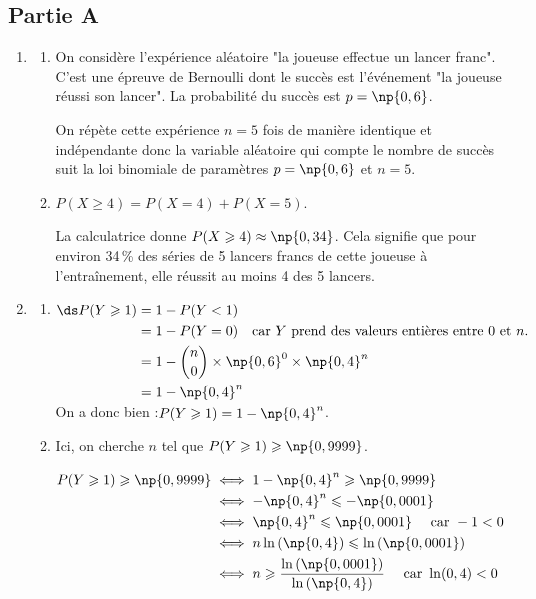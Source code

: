 \subsection*{Partie A}

	\medskip

	\begin{enumerate}
		\item \begin{enumerate}
			\item On considère l'expérience aléatoire "la joueuse effectue un lancer franc". C'est une épreuve de Bernoulli dont le succès est l'événement "la joueuse réussi son lancer". La probabilité du succès est $p=\np{0,6}$.

			On répète cette expérience $n=5$ fois de manière identique et indépendante donc la variable aléatoire qui compte le nombre de succès suit la loi binomiale de paramètres $p=\np{0,6}$ et $n=5$.

			\item $P(X \geqslant 4)=P(X=4) + P(X=5)$.

			La calculatrice donne $P(X \geqslant 4) \approx \np{0,34}$. Cela signifie que pour environ 34\,\% des séries de 5 lancers francs de cette joueuse à l'entraînement, elle réussit au moins 4 des 5 lancers.
		\end{enumerate}

		\item \begin{enumerate}
			\item $\ds \begin{aligned}[t] P(Y \geqslant 1) &=1 - P(Y < 1) \\
				& =1 - P(Y=0)\quad \text{car $Y$ prend des valeurs entières entre 0 et $n$.}\\
				& = 1 - \binom{n}{0} \times \np{0,6}^0 \times \np{0,4}^n\\
				& =1 - \np{0,4}^n
			\end{aligned}$
			On a donc bien :\quad $P(Y \geqslant 1)  =1 - \np{0,4}^n$.

			\item Ici, on cherche $n$ tel que $P(Y \geqslant 1) \geqslant \np{0,9999}$.

			$\begin{aligned}[t] P(Y \geqslant 1) \geqslant \np{0,9999} &\iff 1- \np{0,4}^n \geqslant \np{0,9999}\\
			& \iff -\np{0,4}^n \leqslant -\np{0,0001}\\
			& \iff \np{0,4}^n \leqslant \np{0,0001}\quad \text{ car } -1 < 0\\
			& \iff n \ln\left( \np{0,4} \right) \leqslant \ln \left( \np{0,0001} \right)\\
			& \iff n \geqslant \frac{\ln \left( \np{0,0001} \right)}{\ln\left( \np{0,4} \right)} \quad \text{ car } \ln(0,4) < 0
			\end{aligned}$


\end{enumerate}
\end{enumerate}
